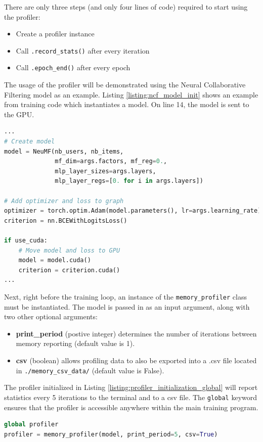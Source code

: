 \documentclass[12pt,letterpaper]{article}
\newenvironment{myitemize}
{ \begin{itemize}
    \setlength{\itemsep}{0pt}
    \setlength{\parskip}{0pt}
    \setlength{\parsep}{0pt}     }
{ \end{itemize}                  }
\begin{document}
There are only three steps (and only four lines of code) required to start using the profiler:
\begin{myitemize}
\item Create a profiler instance
\item Call \texttt{.record\_stats()} after every iteration
\item Call \texttt{.epoch\_end()} after every epoch
\end{myitemize}
The usage of the profiler will be demonstrated using the Neural Collaborative Filtering model as an example. Listing \ref{listing:ncf_model_init} shows an example from training code \cite{tbd_suite} which instantiates a model. On line 14, the model is sent to the GPU.
\begin{lstlisting}[language=Python, caption={Initialization of an NCF model}, label={listing:ncf_model_init}]
...
# Create model
model = NeuMF(nb_users, nb_items,
              mf_dim=args.factors, mf_reg=0.,
              mlp_layer_sizes=args.layers,
              mlp_layer_regs=[0. for i in args.layers])

# Add optimizer and loss to graph
optimizer = torch.optim.Adam(model.parameters(), lr=args.learning_rate)
criterion = nn.BCEWithLogitsLoss()

if use_cuda:
    # Move model and loss to GPU
    model = model.cuda()
    criterion = criterion.cuda()
...
\end{lstlisting}
Next, right before the training loop, an instance of the \texttt{memory\_profiler} class must be instantiated. The model is passed in as an input argument, along with two other optional arguments:
\begin{myitemize}
\item \textbf{print\_period} (postive integer) determines the number of iterations between memory reporting (default value is 1).
\item \textbf{csv} (boolean) allows profiling data to also be exported into a .csv file located in \texttt{./memory\_csv\_data/} (default value is False).
\end{myitemize}
The profiler initialized in Listing \ref{listing:profiler_initialization_global} will report statistics every 5 iterations to the terminal and to a csv file. The \texttt{global} keyword ensures that the profiler is accessible anywhere within the main training program.
\begin{lstlisting}[language=Python, caption={How to create an instance of the PyTorch memory profiler}, label={listing:profiler_initialization_global}]
global profiler
profiler = memory_profiler(model, print_period=5, csv=True)
\end{lstlisting}
\end{document}
